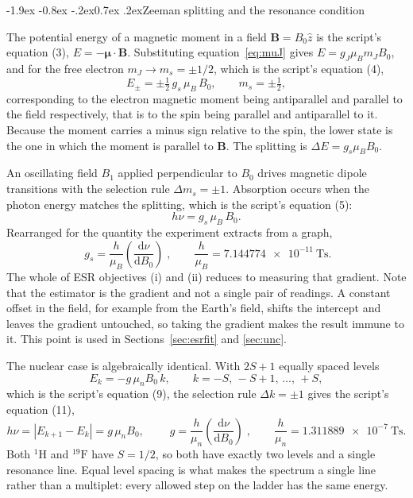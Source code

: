 \documentclass[11pt,a4paper]{article}
\makeatletter
\renewcommand\subsection{\@startsection{subsection}{2}{\z@}%
  {-1.9ex \@plus -0.8ex \@minus -.2ex}{0.7ex \@plus .2ex}{\normalfont\normalsize\bfseries}}
\makeatother
\begin{document}
\subsection{Zeeman splitting and the resonance condition}

The potential energy of a magnetic moment in a field $\mathbf{B} = B_0\hat{z}$ is the script's
equation (3), $E = -\boldsymbol{\mu}\cdot\mathbf{B}$. Substituting equation~\eqref{eq:muJ} gives
$E = g_J\mu_B m_J B_0$, and for the free electron $m_J \to m_s = \pm 1/2$, which is the script's
equation (4),
\begin{equation}
E_{\pm} = \pm\tfrac{1}{2}\,g_s\,\mu_B\,B_0 , \qquad m_s = \pm\tfrac{1}{2} ,
\end{equation}
corresponding to the electron magnetic moment being antiparallel and parallel to the field
respectively, that is to the spin being parallel and antiparallel to it. Because the
moment carries a minus sign relative to the spin, the lower state is the one in which the moment
is parallel to $\mathbf{B}$. The splitting is $\Delta E = g_s\mu_B B_0$.

An oscillating field $B_1$ applied perpendicular to $B_0$ drives magnetic dipole transitions with
the selection rule $\Delta m_s = \pm 1$. Absorption occurs when the photon energy matches the
splitting, which is the script's equation (5):
\begin{equation}
h\nu = g_s\,\mu_B\,B_0 .
\label{eq:esrres}
\end{equation}
Rearranged for the quantity the experiment extracts from a graph,
\begin{equation}
\boxed{\;g_s = \frac{h}{\mu_B}\left(\frac{\mathrm{d}\nu}{\mathrm{d}B_0}\right)\;} ,
\qquad \frac{h}{\mu_B} = \SI{7.144774e-11}{\tesla\second} .
\label{eq:gwork}
\end{equation}
The whole of ESR objectives (i) and (ii) reduces to measuring that gradient. Note that the
estimator is the gradient and not a single pair of readings. A constant offset in the field, for
example from the Earth's field, shifts the intercept and leaves the gradient untouched, so taking
the gradient makes the result immune to it. This point is used in Sections~\ref{sec:esrfit} and
\ref{sec:unc}.

The nuclear case is algebraically identical. With $2S+1$ equally spaced levels
\begin{equation}
E_k = -g\,\mu_n B_0\,k , \qquad k = -S,\,-S+1,\,\ldots,\,+S ,
\end{equation}
which is the script's equation (9), the selection rule $\Delta k = \pm 1$ gives the script's
equation (11),
\begin{equation}
h\nu = \left|E_{k+1} - E_k\right| = g\,\mu_n B_0 ,
\qquad
\boxed{\;g = \frac{h}{\mu_n}\left(\frac{\mathrm{d}\nu}{\mathrm{d}B_0}\right)\;} ,
\qquad \frac{h}{\mu_n} = \SI{1.311889e-7}{\tesla\second} .
\label{eq:nmrres}
\end{equation}
Both $^{1}\mathrm{H}$ and $^{19}\mathrm{F}$ have $S = 1/2$, so both have exactly two levels and a
single resonance line. Equal level spacing is what makes the spectrum a single line rather than a
multiplet: every allowed step on the ladder has the same energy.
\end{document}
